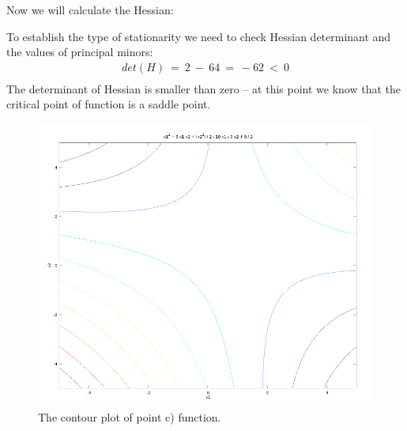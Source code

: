 \documentclass[eng,openany]{mgr}
\begin{document}
Now we will calculate the Hessian:
To establish the type of stationarity we need to check Hessian determinant and the values of principal minors:
\begin{align*}
det(H)\ =\ 2\ -\ 64\ =\ -62\ <\ 0\\
\end{align*}
The determinant of Hessian is smaller than zero -- at this point we know that the critical point of function is a saddle point.
\\


\begin{figure}[h]
\centering
\includegraphics[width=0.7\linewidth]{screenshot006}
\caption{The contour plot of point c) function.}
\label{fig:screenshot006}
\end{figure}
\end{document}
